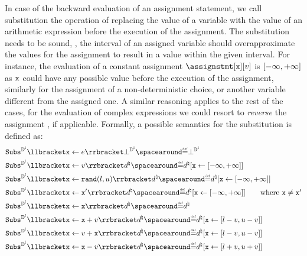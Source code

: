 \begin{description}
  In case of the backward evaluation of an assignment statement, we call substitution the operation of replacing the value of a variable with the value of an arithmetic expression before the execution of the assignment. The substitution needs to be sound, \ie, the interval of an assigned variable should overapproximate the values for the assignment to result in a value within the given interval.
  For instance, the evaluation of a constant assignment $\assignstmt[\defvariable][\defvalue]$ is $[-\infty, +\infty]$ as $\textup{\texttt{x}}$ could have any possible value before the execution of the assignment, similarly for the assignment of a non-deterministic choice, or another variable different from the assigned one. A similar reasoning applies to the rest of the cases, for the evaluation of complex expressions we could resort to \emph{reverse} the assignment , if applicable.
  Formally, a possible semantics for the substitution is defined as:
  \begin{align*}
    &\intervalabstractdomainsubstitute \substitutionof{\defvariable}{\defaexp}\intervalabstractdomainbottom \DefeQ \intervalabstractdomainbottom \\
    &\intervalabstractdomainsubstitute \substitutionof{\defvariable}{\defvalue}\defabstractvalue \DefeQ \updatemem{\defabstractvalue}{\defvariable}{\intervaltop} \\
    &\intervalabstractdomainsubstitute \substitutionof{\defvariable}{\randval(l, u)}\defabstractvalue \DefeQ \updatemem{\defabstractvalue}{\defvariable}{\intervaltop} \\
    &\intervalabstractdomainsubstitute \substitutionof{\defvariable}{\defvariable'}\defabstractvalue \DefeQ \updatemem{\defabstractvalue}{\defvariable}{\intervaltop} \tag*{where $\defvariable \neq \defvariable'$}\\
    &\intervalabstractdomainsubstitute \substitutionof{\defvariable}{\defvariable}\defabstractvalue \DefeQ \defabstractvalue \\
    &\intervalabstractdomainsubstitute \substitutionof{\defvariable}{\defvariable + \defvalue}\defabstractvalue \DefeQ \updatemem{\defabstractvalue}{\defvariable}{\interval{l-\defvalue}{u-\defvalue}} \\
    &\intervalabstractdomainsubstitute \substitutionof{\defvariable}{\defvalue + \defvariable}\defabstractvalue \DefeQ \updatemem{\defabstractvalue}{\defvariable}{\interval{l-\defvalue}{u-\defvalue}} \\
    &\intervalabstractdomainsubstitute \substitutionof{\defvariable}{\defvariable - \defvalue}\defabstractvalue \DefeQ \updatemem{\defabstractvalue}{\defvariable}{\interval{l+\defvalue}{u+\defvalue}} \\

\end{align*}
\end{description}
